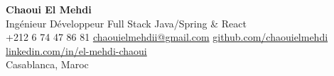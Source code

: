 \documentclass[10pt,a4paper]{article}
\newcommand{\cvname}[1]{{\Huge\bfseries #1}}
\newcommand{\cvtitle}[1]{{\Large\color{cvgray} #1}}
\begin{document}
\begin{center}
    \cvname{Chaoui El Mehdi}\\[2pt]
    \cvtitle{Ingénieur Développeur Full Stack Java/Spring \& React}\\[6pt]
    +212 6 74 47 86 81 \;\textbar\;
    \href{mailto:chaouielmehdii@gmail.com}{chaouielmehdii@gmail.com} \;\textbar\;
    \href{https://github.com/chaouielmehdi}{github.com/chaouielmehdi} \;\textbar\;
    \href{https://linkedin.com/in/el-mehdi-chaoui}{linkedin.com/in/el-mehdi-chaoui}\\[2pt]
    Casablanca, Maroc
\end{center}

\vspace{-4pt}






\end{document}
